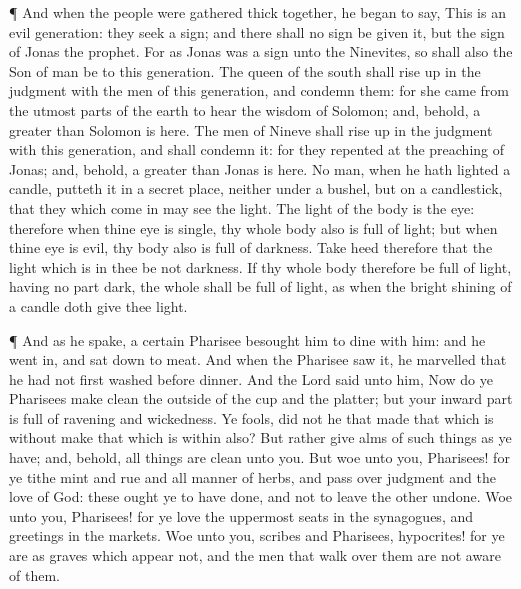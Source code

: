  ¶ And when the people were gathered thick together, he
began to say, This is an evil generation: they seek a sign; and there
shall no sign be given it, but the sign of Jonas the prophet.
 For as Jonas was a sign unto the Ninevites, so shall also
the Son of man be to this generation.  The queen of the
south shall rise up in the judgment with the men of this generation, and
condemn them: for she came from the utmost parts of the earth to hear
the wisdom of Solomon; and, behold, a greater than Solomon is here.
 The men of Nineve shall rise up in the judgment with this
generation, and shall condemn it: for they repented at the preaching of
Jonas; and, behold, a greater than Jonas is here.  No man,
when he hath lighted a candle, putteth it in a secret place, neither
under a bushel, but on a candlestick, that they which come in may see
the light.  The light of the body is the eye: therefore
when thine eye is single, thy whole body also is full of light; but when
thine eye is evil, thy body also is full of darkness.  Take
heed therefore that the light which is in thee be not darkness.
 If thy whole body therefore be full of light, having no
part dark, the whole shall be full of light, as when the bright shining
of a candle doth give thee light.

 ¶ And as he spake, a certain Pharisee besought him to dine
with him: and he went in, and sat down to meat.  And when
the Pharisee saw it, he marvelled that he had not first washed before
dinner.  And the Lord said unto him, Now do ye Pharisees
make clean the outside of the cup and the platter; but your inward part
is full of ravening and wickedness.  Ye fools, did not he
that made that which is without make that which is within also?
 But rather give alms of such things as ye have; and,
behold, all things are clean unto you.  But woe unto you,
Pharisees! for ye tithe mint and rue and all manner of herbs, and pass
over judgment and the love of God: these ought ye to have done, and not
to leave the other undone.  Woe unto you, Pharisees! for ye
love the uppermost seats in the synagogues, and greetings in the
markets.  Woe unto you, scribes and Pharisees, hypocrites!
for ye are as graves which appear not, and the men that walk over them
are not aware of them.

